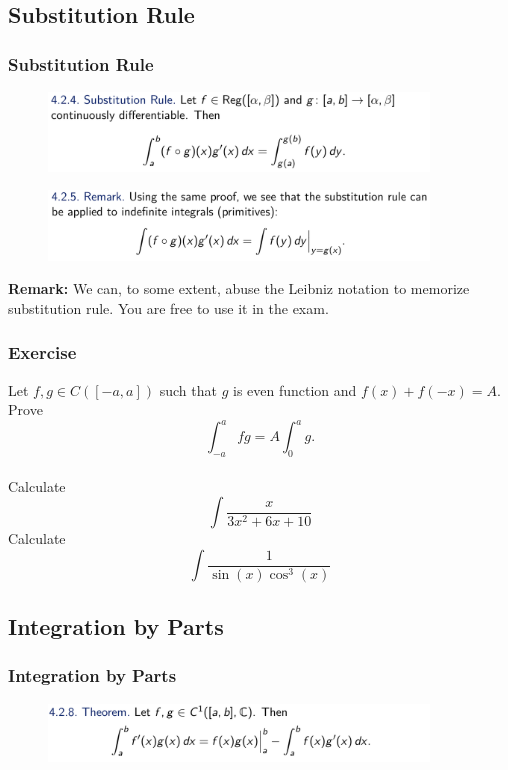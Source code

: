 \documentclass[10pt, t]{beamer}
\newcommand{\nullspace}{~\\[15pt]}
\begin{document}
\subsection{Substitution Rule}
\begin{frame}
    \frametitle{Substitution Rule}

    \begin{figure}[H]
        \centering
        \includegraphics[width=0.9\textwidth]{2020-12-02-13-41-48.png}
    \end{figure}
    \begin{figure}[H]
        \centering
        \includegraphics[width=0.9\textwidth]{2020-12-02-13-42-07.png}
    \end{figure}
    \textbf{Remark:} We can, to some extent, abuse the Leibniz notation to memorize substitution rule. You are free to use it in the exam.

\end{frame}
\begin{frame}
    \frametitle{Exercise}
    Let $f,g\in C([-a,a])$ such that $g$ is even function and $f(x)+f(-x)=A$. Prove $$\int_{-a}^a fg=A\int_0^a g.$$
    \nullspace Calculate
    $$\int\dfrac{x}{3x^2+6x+10}$$
    Calculate
    $$\int\dfrac{1}{\sin(x)\cos^3(x)}$$
\end{frame}

\subsection{Integration by Parts}
\begin{frame}
    \frametitle{Integration by Parts}
    \begin{figure}[H]
        \centering
        \includegraphics[width=0.9\textwidth]{2020-12-02-13-43-47.png}
    \end{figure}
\end{frame}
\end{document}

